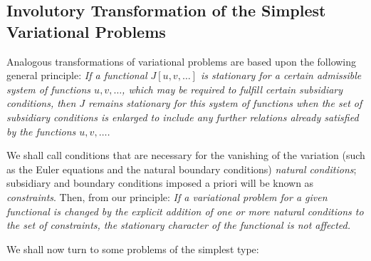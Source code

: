 \subsection{Involutory Transformation of the Simplest Variational Problems}
Analogous transformations of variational problems are based upon the following general principle: \emph{If a functional $J[u,v,\ldots]$ is stationary for a certain admissible system of functions $u,v,\ldots$, which may be required to fulfill certain subsidiary conditions, then $J$ remains stationary for this system of functions when the set of subsidiary conditions is enlarged to include any further relations already satisfied by the functions $u,v,\ldots$.}

We shall call conditions that are necessary for the vanishing of the variation (such as the Euler equations and the natural boundary conditions) \emph{natural conditions}; subsidiary and boundary conditions imposed a priori will be known as \emph{constraints}. Then, from our principle: \emph{If a variational problem for a given functional is changed by the explicit addition of one or more natural conditions to the set of constraints, the stationary character of the functional is not affected.}

We shall now turn to some problems of the simplest type:


